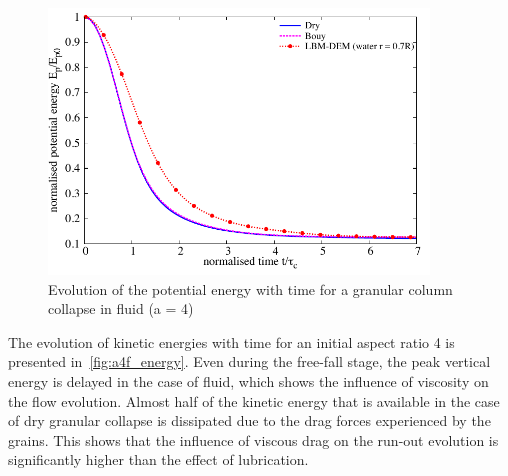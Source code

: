 \begin{figure}
	\centering
    \includegraphics[width=0.9\textwidth]{PE_a4f}
    \caption{Evolution of the potential energy with time for a granular column 
    collapse in fluid (a = 4)}
    \label{fig:PE_a4f}
\end{figure}

The evolution of kinetic energies with time for an initial aspect ratio 4 is 
presented in~\cref{fig:a4f_energy}. Even during the free-fall stage, the peak 
vertical energy is delayed in the case of fluid, which shows the influence of 
viscosity on the flow evolution. Almost half of the kinetic energy that is 
available in the case of dry granular collapse is dissipated due to the drag 
forces experienced by the grains. This shows that the influence of viscous drag 
on the run-out evolution is significantly higher than the effect of lubrication.

